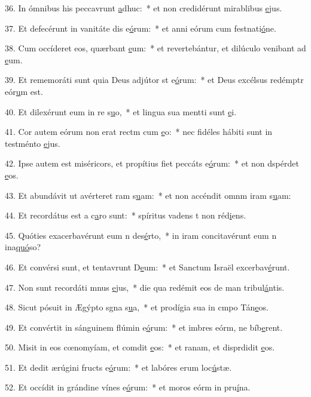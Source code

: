 36. In ómnibus his peccavrunt \uline{a}dhuc:~* et non credidérunt mirablibus \uline{e}jus.\par 
37. Et defecérunt in vanitáte dis e\uline{ó}rum:~* et anni eórum cum festnati\uline{ó}ne.\par 
38. Cum occíderet eos, quærbant \uline{e}um:~* et revertebántur, et dilúculo venibant ad \uline{e}um.\par 
39. Et rememoráti sunt quia Deus adjútor st e\uline{ó}rum:~* et Deus excélsus redémptr eór\uline{u}m est.\par 
40. Et dilexérunt eum in re s\uline{u}o,~* et lingua sua mentti sunt \uline{e}i.\par 
41. Cor autem eórum non erat rectm cum \uline{e}o:~* nec fidéles hábiti sunt in testménto \uline{e}jus.\par 
42. Ipse autem est miséricors, et propítius fiet peccáts e\uline{ó}rum:~* et non dspérdet \uline{e}os.\par 
43. Et abundávit ut avérteret ram s\uline{u}am:~* et non accéndit omnm iram s\uline{u}am:\par 
44. Et recordátus est a c\uline{a}ro sunt:~* spíritus vadens t non réd\uline{i}ens.\par 
45. Quóties exacerbavérunt eum n des\uline{é}rto,~* in iram concitavérunt eum n ina\uline{quó}so?\par 
46. Et convérsi sunt, et tentavrunt D\uline{e}um:~* et Sanctum Israël excerbav\uline{é}runt.\par 
47. Non sunt recordáti mnus \uline{e}jus,~* die qua redémit eos de man tribul\uline{á}ntis.\par 
48. Sicut pósuit in Ægýpto sgna s\uline{u}a,~* et prodígia sua in cmpo Tán\uline{e}os.\par 
49. Et convértit in sánguinem flúmin e\uline{ó}rum:~* et imbres eórm, ne bíb\uline{e}rent.\par 
50. Misit in eos cœnomyíam, et comdit \uline{e}os:~* et ranam, et disprdidit \uline{e}os.\par 
51. Et dedit ærúgini fructs e\uline{ó}rum:~* et labóres erum loc\uline{ú}stæ.\par 
52. Et occídit in grándine vínes e\uline{ó}rum:~* et moros eórm in pru\uline{í}na.\par 
